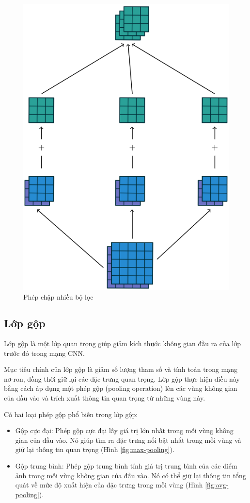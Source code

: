 \begin{figure}[h]
	\centering
	\includegraphics[width=0.6\linewidth]{images/multiple-filter-block-conv}
	\caption{Phép chập nhiều bộ lọc \cite{wei2021}}
	\label{fig:multiple-filter-block-conv}
\end{figure}



\subsection{Lớp gộp}
Lớp gộp là một lớp quan trọng giúp giảm kích thước không gian đầu ra của lớp trước đó trong mạng CNN. 

Mục tiêu chính của lớp gộp là giảm số lượng tham số và tính toán trong mạng nơ-ron, đồng thời giữ lại các đặc trưng quan trọng. Lớp gộp thực hiện điều này bằng cách áp dụng một phép gộp (pooling operation) lên các vùng không gian của đầu vào và trích xuất thông tin quan trọng từ những vùng này.

Có hai loại phép gộp phổ biến trong lớp gộp:

\begin{itemize}
	\item Gộp cực đại: Phép gộp cực đại lấy giá trị lớn nhất trong mỗi vùng không gian của đầu vào. Nó giúp tìm ra đặc trưng nổi bật nhất trong mỗi vùng và giữ lại thông tin quan trọng (Hình \ref{fig:max-pooling}).
	\item Gộp trung bình: Phép gộp trung bình tính giá trị trung bình của các điểm ảnh trong mỗi vùng không gian của đầu vào. Nó có thể giữ lại thông tin tổng quát về mức độ xuất hiện của đặc trưng trong mỗi vùng (Hình \ref{fig:avg-pooling}).
\end{itemize}


